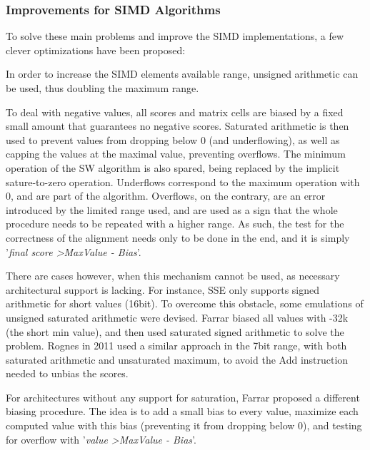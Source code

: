 	
\subsubsection{Improvements for SIMD Algorithms}

To solve these main problems and improve the SIMD implementations, a few clever optimizations have been proposed:


In order to increase the SIMD elements available range, unsigned arithmetic can be used, thus doubling the maximum range.

To deal with negative values, all scores and matrix cells are biased by a fixed small amount that guarantees no negative scores. Saturated arithmetic is then used to prevent values from dropping below 0 (and underflowing), as well as capping the values at the maximal value, preventing overflows. The minimum operation of the \ac{SW} algorithm is also spared, being replaced by the implicit sature-to-zero operation. Underflows correspond to the maximum operation with 0, and are part of the algorithm. Overflows, on the contrary, are an error introduced by the limited range used, and are used as a sign that the whole procedure needs to be repeated with a higher range. As such, the test for the correctness of the alignment needs only to be done in the end, and it is simply '\emph{final score \textgreater MaxValue - Bias}'.

There are cases however, when this mechanism cannot be used, as necessary architectural support is lacking. For instance, SSE only supports  signed arithmetic for short values (16bit). To overcome this obstacle, some emulations of unsigned saturated arithmetic were devised. Farrar biased all values with -32k (the short min value), and then used saturated signed arithmetic to solve the problem. Rognes \cite{rognes2011} in 2011 used a similar approach in the 7bit range, with both saturated arithmetic and unsaturated maximum, to avoid the Add instruction needed to unbias the scores.
		
For architectures without any support for saturation, Farrar \cite{farrarcell} proposed a different biasing procedure. The idea is to add a small bias to every value, maximize each computed value with this bias (preventing it from dropping below 0), and testing for overflow with '\emph{value \textgreater MaxValue - Bias}'.

\label{scoring-profile}

